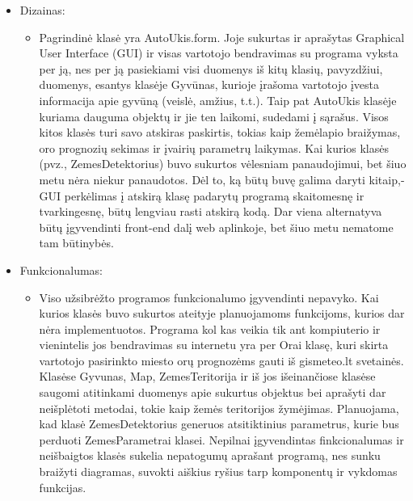 \documentclass[oneside]{VUMIFPSkursinis}
\begin{document}
	
	\pagebreak
	\begin{itemize}
		\item Dizainas: 
		\begin{itemize}
			\item Pagrindinė klasė yra AutoUkis.form. Joje sukurtas ir aprašytas Graphical User Interface (GUI) ir visas vartotojo bendravimas su programa vyksta per ją, nes per ją pasiekiami visi duomenys iš kitų klasių, pavyzdžiui, duomenys, esantys klasėje Gyvūnas, kurioje įrašoma vartotojo įvesta informacija apie gyvūną (veislė, amžius, t.t.). Taip pat AutoUkis klasėje kuriama dauguma objektų ir jie ten laikomi, sudedami į sąrašus. Visos kitos klasės turi savo atskiras paskirtis, tokias kaip žemėlapio braižymas, oro prognozių sekimas ir įvairių parametrų laikymas. Kai kurios klasės (pvz., ZemesDetektorius) buvo sukurtos vėlesniam panaudojimui, bet šiuo metu nėra niekur panaudotos.
Dėl to, ką būtų buvę galima daryti kitaip,- GUI perkėlimas į atskirą klasę padarytų programą skaitomesnę ir tvarkingesnę, būtų lengviau rasti atskirą kodą. Dar viena alternatyva būtų įgyvendinti front-end dalį web aplinkoje, bet šiuo metu nematome tam būtinybės.
		\end{itemize}
		\item Funkcionalumas:
		\begin{itemize}
		\item Viso užsibrėžto programos funkcionalumo įgyvendinti nepavyko. Kai kurios klasės buvo sukurtos ateityje planuojamoms funkcijoms, kurios dar nėra implementuotos. Programa kol kas veikia tik ant kompiuterio ir vienintelis jos bendravimas su internetu yra per Orai klasę, kuri skirta vartotojo pasirinkto miesto orų prognozėms gauti iš gismeteo.lt svetainės. Klasėse Gyvunas, Map, ZemesTeritorija ir iš jos išeinančiose klasėse saugomi atitinkami duomenys apie sukurtus objektus bei aprašyti dar neišplėtoti metodai, tokie kaip žemės teritorijos žymėjimas. Planuojama, kad klasė ZemesDetektorius generuos atsitiktinius parametrus, kurie bus perduoti ZemesParametrai klasei.
Nepilnai įgyvendintas finkcionalumas ir neišbaigtos klasės sukelia nepatogumų aprašant programą, nes sunku braižyti diagramas, suvokti aiškius ryšius tarp komponentų ir vykdomas funkcijas.
		\end{itemize}	
	\end{itemize}
	\pagebreak
\end{document}
